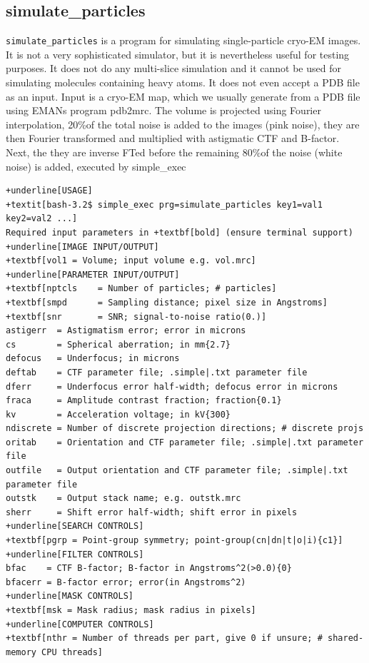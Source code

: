 \documentclass[a4paper,11pt]{article}
\newcommand{\prgname}[1]{\textcolor{NavyBlue}{\texttt{#1}}}
\begin{document}
\subsection{simulate\_particles}
\label{simulate_particles}
\prgname{simulate\_particles} is a program for simulating single-particle cryo-EM images. It is not a very sophisticated simulator, but it is nevertheless useful for testing purposes. It does not do any multi-slice simulation and it cannot be used for simulating molecules containing heavy atoms. It does not even accept a PDB file as an input. Input is a cryo-EM map, which we usually generate from a PDB file using EMANs program pdb2mrc. The volume is projected using Fourier interpolation, 20\%of the total noise is added to the images (pink noise), they are then Fourier transformed and multiplied with astigmatic CTF and B-factor. Next, the they are inverse FTed before the remaining 80\%of the noise (white noise) is added, executed by simple\_exec
\begin{Verbatim}[commandchars=+\[\],fontsize=\small,breaklines=true]
+underline[USAGE]
+textit[bash-3.2$ simple_exec prg=simulate_particles key1=val1 key2=val2 ...]
Required input parameters in +textbf[bold] (ensure terminal support)
+underline[IMAGE INPUT/OUTPUT]
+textbf[vol1 = Volume; input volume e.g. vol.mrc]
+underline[PARAMETER INPUT/OUTPUT]
+textbf[nptcls    = Number of particles; # particles]
+textbf[smpd      = Sampling distance; pixel size in Angstroms]
+textbf[snr       = SNR; signal-to-noise ratio(0.)]
astigerr  = Astigmatism error; error in microns
cs        = Spherical aberration; in mm{2.7}
defocus   = Underfocus; in microns
deftab    = CTF parameter file; .simple|.txt parameter file
dferr     = Underfocus error half-width; defocus error in microns
fraca     = Amplitude contrast fraction; fraction{0.1}
kv        = Acceleration voltage; in kV{300}
ndiscrete = Number of discrete projection directions; # discrete projs
oritab    = Orientation and CTF parameter file; .simple|.txt parameter file
outfile   = Output orientation and CTF parameter file; .simple|.txt parameter file
outstk    = Output stack name; e.g. outstk.mrc
sherr     = Shift error half-width; shift error in pixels
+underline[SEARCH CONTROLS]
+textbf[pgrp = Point-group symmetry; point-group(cn|dn|t|o|i){c1}]
+underline[FILTER CONTROLS]
bfac    = CTF B-factor; B-factor in Angstroms^2(>0.0){0}
bfacerr = B-factor error; error(in Angstroms^2)
+underline[MASK CONTROLS]
+textbf[msk = Mask radius; mask radius in pixels]
+underline[COMPUTER CONTROLS]
+textbf[nthr = Number of threads per part, give 0 if unsure; # shared-memory CPU threads]
\end{Verbatim}
\end{document}
